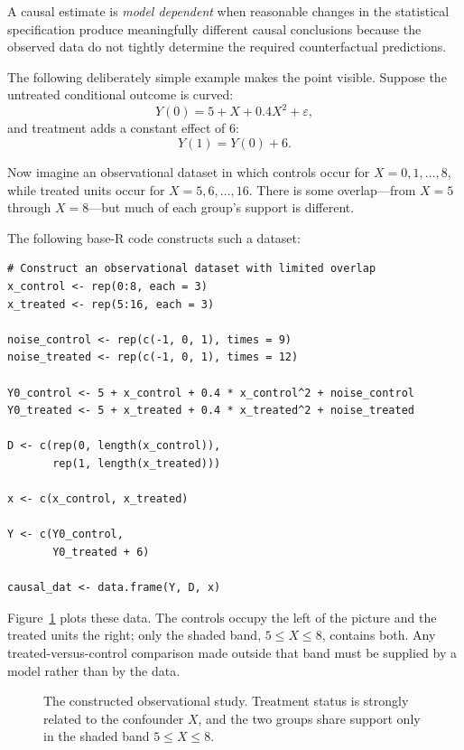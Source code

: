 \documentclass[11pt]{report}
\newcommand{\overlapdatapoints}{%
  \addplot[only marks,mark=o,mark size=1.6pt,domain=0:8,samples=9] {5 + x + 0.4*x^2};
  \addplot[only marks,mark=o,mark size=1.6pt,domain=0:8,samples=9,forget plot] {4 + x + 0.4*x^2};
  \addplot[only marks,mark=o,mark size=1.6pt,domain=0:8,samples=9,forget plot] {6 + x + 0.4*x^2};
  \addplot[only marks,mark=*,mark size=1.6pt,domain=5:16,samples=12] {11 + x + 0.4*x^2};
  \addplot[only marks,mark=*,mark size=1.6pt,domain=5:16,samples=12,forget plot] {10 + x + 0.4*x^2};
  \addplot[only marks,mark=*,mark size=1.6pt,domain=5:16,samples=12,forget plot] {12 + x + 0.4*x^2};
}
\begin{document}
A causal estimate is \emph{model dependent} when reasonable changes in the statistical specification produce meaningfully different causal conclusions because the observed data do not tightly determine the required counterfactual predictions.

The following deliberately simple example makes the point visible. Suppose the untreated conditional outcome is curved:
\[
Y(0)=5+X+0.4X^2+\varepsilon,
\]
and treatment adds a constant effect of 6:
\[
Y(1)=Y(0)+6.
\]

Now imagine an observational dataset in which controls occur for \(X=0,1,\ldots,8\), while treated units occur for \(X=5,6,\ldots,16\). There is some overlap---from \(X=5\) through \(X=8\)---but much of each group's support is different.

The following base-R code constructs such a dataset:

\begin{lstlisting}
# Construct an observational dataset with limited overlap
x_control <- rep(0:8, each = 3)
x_treated <- rep(5:16, each = 3)

noise_control <- rep(c(-1, 0, 1), times = 9)
noise_treated <- rep(c(-1, 0, 1), times = 12)

Y0_control <- 5 + x_control + 0.4 * x_control^2 + noise_control
Y0_treated <- 5 + x_treated + 0.4 * x_treated^2 + noise_treated

D <- c(rep(0, length(x_control)),
       rep(1, length(x_treated)))

x <- c(x_control, x_treated)

Y <- c(Y0_control,
       Y0_treated + 6)

causal_dat <- data.frame(Y, D, x)
\end{lstlisting}

Figure~\ref{fig:overlap_data} plots these data. The controls occupy the left of the picture and the treated units the right; only the shaded band, \(5\leq X\leq 8\), contains both. Any treated-versus-control comparison made outside that band must be supplied by a model rather than by the data.

\begin{figure}[H]
\centering
{}
\caption{The constructed observational study. Treatment status is strongly related to the confounder \(X\), and the two groups share support only in the shaded band \(5\leq X\leq 8\).}
\label{fig:overlap_data}
\end{figure}
\end{document}
